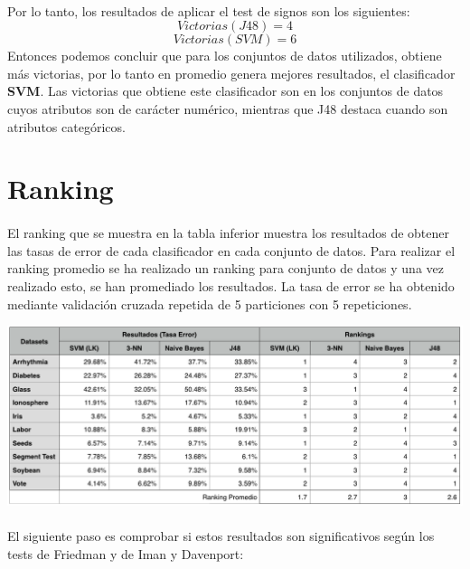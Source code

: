 \documentclass[10pt, a4paper,spanish]{article}
\begin{document}
		\paragraph{}
		Por lo tanto, los resultados de aplicar el test de signos son los siguientes:
		\[Victorias(J48) = 4\]
		\[Victorias(SVM) = 6\]
		Entonces podemos concluir que para los conjuntos de datos utilizados, obtiene más victorias, por lo tanto en promedio genera mejores resultados, el clasificador \textbf{SVM}. Las victorias que obtiene este clasificador son en los conjuntos de datos cuyos atributos son de carácter numérico, mientras que J48 destaca cuando son atributos categóricos.

	\section{Ranking}

		\paragraph{}
		El ranking que se muestra en la tabla inferior muestra los resultados de obtener las tasas de error de cada clasificador en cada conjunto de datos. Para realizar el ranking promedio se ha realizado un ranking para conjunto de datos y una vez realizado esto, se han promediado los resultados. La tasa de error se ha obtenido mediante validación cruzada repetida de 5 particiones con 5 repeticiones.

		\begin{center}
			\includegraphics[width=\textwidth]{ranking-table}
		\end{center}

		\paragraph{}
		El siguiente paso es comprobar si estos resultados son significativos según los tests de Friedman y de Iman y Davenport:
\end{document}
